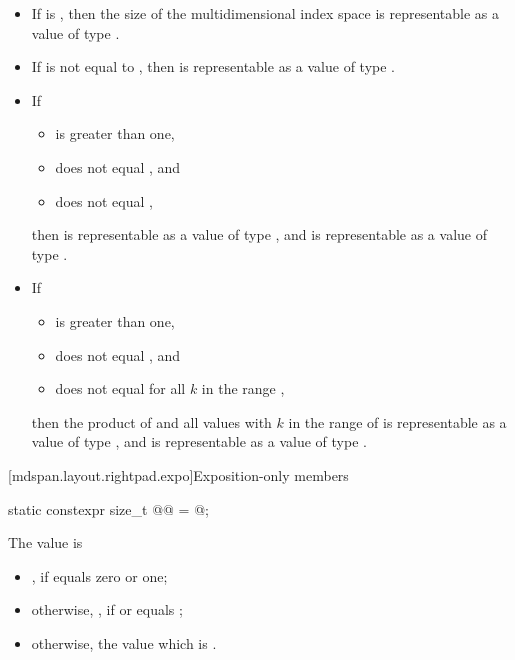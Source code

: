 \pnum
\mandates
\begin{itemize}
\item
If  is ,
then the size of the multidimensional index space 
is representable as a value of type .
\item
If  is not equal to , then
 is representable as a value of type .
\item
If
\begin{itemize}
\item
{} is greater than one,
\item
{} does not equal , and
\item
{} does not equal ,
\end{itemize}
then 
is representable as a value of type , and
is representable as a value of type .
\item
If
\begin{itemize}
\item
{} is greater than one,
\item
{} does not equal , and
\item
{} does not equal 
for all $k$ in the range ,
\end{itemize}
then the product of
 and
all values 
with $k$ in the range of 
is representable as a value of type , and
is representable as a value of type .
\end{itemize}

[mdspan.layout.rightpad.expo]{Exposition-only members}

\begin{itemdecl}
static constexpr size_t @@ = @\seebelow@;
\end{itemdecl}

\begin{itemdescr}
\pnum
The value is
\begin{itemize}
\item
{}, if  equals zero or one;
\item
otherwise, ,
if  or  equals
;
\item
otherwise, the  value which is
.
\end{itemize}
\end{itemdescr}

